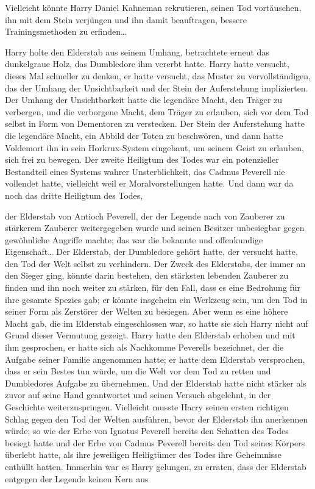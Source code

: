 {Vielleicht könnte Harry Daniel Kahneman rekrutieren, seinen Tod vortäuschen, ihn mit dem Stein verjüngen und ihn damit beauftragen, bessere Trainingsmethoden zu erfinden…

Harry holte den Elderstab aus seinem Umhang, betrachtete erneut das dunkelgraue Holz, das Dumbledore ihm vererbt hatte. Harry hatte versucht, dieses Mal schneller zu denken, er hatte versucht, das Muster zu vervollständigen, das der Umhang der Unsichtbarkeit und der Stein der Auferstehung implizierten. Der Umhang der Unsichtbarkeit hatte die legendäre Macht, den Träger zu verbergen, und die verborgene Macht, dem Träger zu erlauben, sich vor dem Tod selbst in Form von Dementoren zu verstecken. Der Stein der Auferstehung hatte die legendäre Macht, ein Abbild der Toten zu beschwören, und dann hatte Voldemort ihn in sein Horkrux-System eingebaut, um seinem Geist zu erlauben, sich frei zu bewegen. Der zweite Heiligtum des Todes war ein potenzieller Bestandteil eines Systems wahrer Unsterblichkeit, das Cadmus Peverell nie vollendet hatte, vielleicht weil er Moralvorstellungen hatte. Und dann war da noch das dritte Heiligtum des Todes,

der Elderstab von Antioch Peverell, der der Legende nach von Zauberer zu stärkerem Zauberer weitergegeben wurde und seinen Besitzer unbesiegbar gegen gewöhnliche Angriffe machte; das war die bekannte und offenkundige Eigenschaft… Der Elderstab, der Dumbledore gehört hatte, der versucht hatte, den Tod der Welt selbst zu verhindern. Der Zweck des Elderstabs, der immer an den Sieger ging, könnte darin bestehen, den stärksten lebenden Zauberer zu finden und ihn noch weiter zu stärken, für den Fall, dass es eine Bedrohung für ihre gesamte Spezies gab; er könnte insgeheim ein Werkzeug sein, um den Tod in seiner Form als Zerstörer der Welten zu besiegen. Aber wenn es eine höhere Macht gab, die im Elderstab eingeschlossen war, so hatte sie sich Harry nicht auf Grund dieser Vermutung gezeigt. Harry hatte den Elderstab erhoben und mit ihm gesprochen, er hatte sich als Nachkomme Peverells bezeichnet, der die Aufgabe seiner Familie angenommen hatte; er hatte dem Elderstab versprochen, dass er sein Bestes tun würde, um die Welt vor dem Tod zu retten und Dumbledores Aufgabe zu übernehmen. Und der Elderstab hatte nicht stärker als zuvor auf seine Hand geantwortet und seinen Versuch abgelehnt, in der Geschichte weiterzuspringen. Vielleicht musste Harry seinen ersten richtigen Schlag gegen den Tod der Welten ausführen, bevor der Elderstab ihn anerkennen würde; so wie der Erbe von Ignotus Peverell bereits den Schatten des Todes besiegt hatte und der Erbe von Cadmus Peverell bereits den Tod seines Körpers überlebt hatte, als ihre jeweiligen Heiligtümer des Todes ihre Geheimnisse enthüllt hatten. Immerhin war es Harry gelungen, zu erraten, dass der Elderstab entgegen der Legende keinen Kern aus

}
